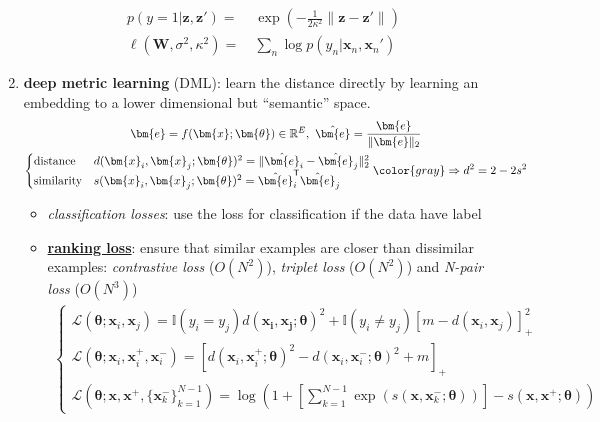 \begin{enumerate}[{(1)}]
\begin{align}
        p(y=1|\bm{z},\bm{z}') =&~ \exp(-\frac{1}{2\kappa^2}\|\bm{z}-\bm{z}'\|) \\
        \ell(\mathbf{W}, \sigma^2, \kappa^2) =&~ \sum_{n}\log{p(y_n|\bm{x}_n,\bm{x}_n')}
    \end{align}
    \item \textbf{deep metric learning} (DML): learn the distance directly by learning an embedding to a lower dimensional but ``semantic'' space.
    \begin{gather}
        \bm{e} = f(\bm{x};\bm{\theta})\in\mathbb{R}^E,~\hat{\bm{e}} = \frac{\bm{e}}{\|\bm{e}\|_2} \label{eq:sec} \\
        \begin{cases}
        \text{distance} & d(\bm{x}_i,\bm{x}_j;\bm{\theta})^2 = \|\hat{\bm{e}}_i-\hat{\bm{e}}_j\|_2^2 \\
        \text{similarity} & s(\bm{x}_i,\bm{x}_j;\bm{\theta})^2 = \hat{\bm{e}}_i^\mathsf{T}\hat{\bm{e}}_j
        \end{cases}
        {\color{gray}\Rightarrow d^2 = 2-2s^2} \\
    \end{gather}
    \begin{itemize}
        \item \textit{classification losses}: use the loss for classification if the data have label
        \item \uline{\textbf{ranking loss}}: ensure that similar examples are closer than dissimilar examples:
        \textit{contrastive loss} ($O(N^2)$), 
        \textit{triplet loss} ($O(N^2)$) and \textit{N-pair loss} ($O(N^3)$)
        {\footnotesize
        \begin{gather}
            \begin{cases}
                \mathcal{L}(\bm{\theta};\bm{x}_i,\bm{x}_j) 
                = \mathbb{I}(y_i=y_j)d(\bm{\bm{x}_i,\bm{x}_j};\bm{\theta})^2
                + \mathbb{I}(y_i\neq y_j)\left[m-d(\bm{x}_i,\bm{x}_j)\right]^2_+ \\
                \mathcal{L}(\bm{\theta};\bm{x}_i,\bm{x}_i^+,\bm{x}_i^-)
                = \left[d(\bm{x}_i,\bm{x}_i^+;\bm{\theta})^2 - d(\bm{x}_i,\bm{x}_i^-;\bm{\theta})^2+m\right]_+ \\
                \mathcal{L}(\bm{\theta};\bm{x},\bm{x}^+,\{\bm{x}_k^-\}_{k=1}^{N-1}) 
                = \log\left(1+\left[\sum_{k=1}^{N-1}\exp(s(\bm{x},\bm{x}_k^-;\bm{\theta}))\right] - s(\bm{x},\bm{x}^+;\bm{\theta})\right)
            \end{cases}
        \end{gather}
        }
    \end{itemize}
\end{enumerate}

